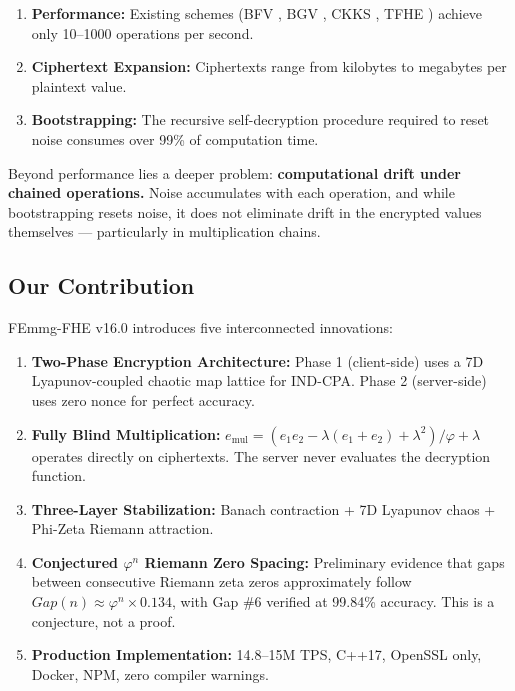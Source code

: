 \documentclass{article}
\begin{document}
\begin{enumerate}
    \item \textbf{Performance:} Existing schemes (BFV \cite{fan2012}, BGV \cite{brakerski2014}, CKKS \cite{cheon2017}, TFHE \cite{chillotti2020}) achieve only 10--1000 operations per second.
    \item \textbf{Ciphertext Expansion:} Ciphertexts range from kilobytes to megabytes per plaintext value.
    \item \textbf{Bootstrapping:} The recursive self-decryption procedure required to reset noise consumes over 99\% of computation time.
\end{enumerate}

Beyond performance lies a deeper problem: \textbf{computational drift under chained operations.} Noise accumulates with each operation, and while bootstrapping resets noise, it does not eliminate drift in the encrypted values themselves — particularly in multiplication chains.

\subsection{Our Contribution}

FEmmg-FHE v16.0 introduces five interconnected innovations:

\begin{enumerate}
    \item \textbf{Two-Phase Encryption Architecture:} Phase 1 (client-side) uses a 7D Lyapunov-coupled chaotic map lattice for IND-CPA. Phase 2 (server-side) uses zero nonce for perfect accuracy.
    
    \item \textbf{Fully Blind Multiplication:} $e_{\text{mul}} = (e_1 e_2 - \lambda(e_1 + e_2) + \lambda^2)/\varphi + \lambda$ operates directly on ciphertexts. The server never evaluates the decryption function.
    
    \item \textbf{Three-Layer Stabilization:} Banach contraction + 7D Lyapunov chaos + Phi-Zeta Riemann attraction.
    
    \item \textbf{Conjectured $\varphi^n$ Riemann Zero Spacing:} Preliminary evidence that gaps between consecutive Riemann zeta zeros approximately follow $Gap(n) \approx \varphi^n \times 0.134$, with Gap \#6 verified at 99.84\% accuracy. This is a conjecture, not a proof.
    
    \item \textbf{Production Implementation:} 14.8--15M TPS, C++17, OpenSSL only, Docker, NPM, zero compiler warnings.
\end{enumerate}
\end{document}
